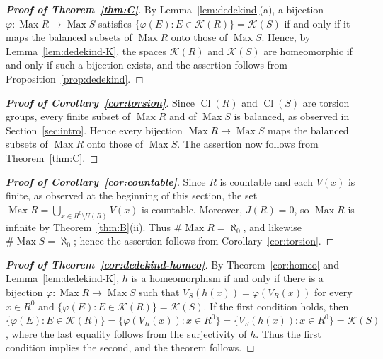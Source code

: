 \documentclass[12pt,reqno,a4paper]{amsart}
\newcommand{\K}{\mathcal{K}}
\DeclareMathOperator{\Max}{Max}
\DeclareMathOperator{\Cl}{Cl}
\theoremstyle{plain}
\theoremstyle{definition}
\begin{document}
\begin{proof}[\normalfont\bfseries Proof of Theorem~\ref{thm:C}]
By Lemma~\ref{lem:dedekind}(a), a bijection $\varphi\colon\Max R\to\Max S$ satisfies $\{\varphi(E):E\in\K(R)\}=\K(S)$ if and only if it maps the balanced subsets of $\Max R$ onto those of $\Max S$. Hence, by Lemma~\ref{lem:dedekind-K}, the spaces $\K(R)$ and $\K(S)$ are homeomorphic if and only if such a bijection exists, and the assertion follows from Proposition~\ref{prop:dedekind}.
\end{proof}
\begin{proof}[\normalfont\bfseries Proof of Corollary~\ref{cor:torsion}]
Since $\Cl(R)$ and $\Cl(S)$ are torsion groups, every finite subset of $\Max R$ and of $\Max S$ is balanced, as observed in Section~\ref{sec:intro}. Hence every bijection $\Max R\to\Max S$ maps the balanced subsets of $\Max R$ onto those of $\Max S$. The assertion now follows from Theorem~\ref{thm:C}.
\end{proof}
\begin{proof}[\normalfont\bfseries Proof of Corollary~\ref{cor:countable}]
Since $R$ is countable and each $V(x)$ is finite, as observed at the beginning of this section, the set $\Max R=\bigcup\limits_{x\in R^0\setminus U(R)}V(x)$ is countable. Moreover, $J(R)=0$, so $\Max R$ is infinite by Theorem~\ref{thm:B}(ii). Thus $\#{\Max R}=\aleph_0$, and likewise $\#{\Max S}=\aleph_0$; hence the assertion follows from Corollary~\ref{cor:torsion}.
\end{proof}
\begin{proof}[\normalfont\bfseries Proof of Theorem~\ref{cor:dedekind-homeo}]
By Theorem~\ref{cor:homeo} and Lemma~\ref{lem:dedekind-K}, $h$ is a homeomorphism if and only if there is a bijection $\varphi\colon\Max R\to\Max S$ such that $V_S(h(x))=\varphi(V_R(x))$ for every $x\in R^0$ and $\{\varphi(E):E\in\K(R)\}=\K(S)$. If the first condition holds, then $\{\varphi(E):E\in\K(R)\}=\{\varphi(V_R(x)):x\in R^0\}=\{V_S(h(x)):x\in R^0\}=\K(S)$, where the last equality follows from the surjectivity of $h$. Thus the first condition implies the second, and the theorem follows.
\end{proof}
\end{document}
